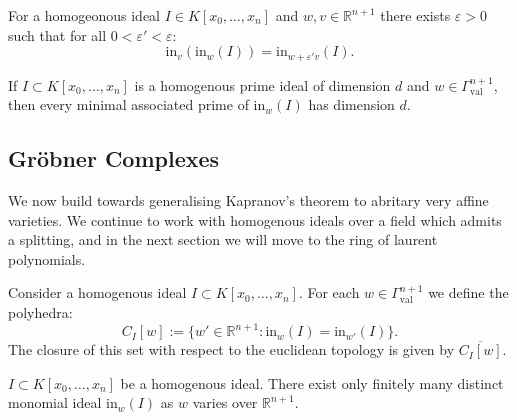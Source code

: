     \begin{proposition}
        \label{ininIdeal}
        For a homogeonous ideal $I \in K[x_0,\dots,x_n]$ and $w,v \in \mathbb{R}^{n+1}$ there exists $\varepsilon >0$ such that for all $0<\varepsilon ' < \varepsilon$:
        \begin{equation*}
            \text{in}_{v}(\text{in}_{w}(I)) = \text{in}_{w + \varepsilon 'v}(I).
        \end{equation*}
    \end{proposition}

    \begin{lemma}
        If $I \subset K[x_0,\dots,x_n]$ is a homogenous prime ideal of dimension $d$ and $w \in \Gamma_{\text{val}}^{n+1}$, then every minimal associated prime of $\text{in}_{w}(I)$ has dimension $d$.
    \end{lemma}

\subsection{Gr\"{o}bner Complexes}

We now build towards generalising Kapranov's theorem to abritary very affine varieties.
We continue to work with homogenous ideals over a field which admits a splitting, and in the next section we will move to the ring of laurent polynomials.

\begin{definition}
    Consider a homogenous ideal $I \subset K[x_{0},\dots, x_{n}]$.
For each $w \in \Gamma_{\text{val}}^{n+1}$ we define the polyhedra:
\begin{equation*}
    C_{I}[w] := \{w' \in \mathbb{R}^{n+1}: \text{in}_{w}(I) = \text{in}_{w'}(I)\}.
\end{equation*}
    The closure of this set with respect to the euclidean topology is given by $\overline{C_{I}[w]}$.
\end{definition}

\begin{proposition}
    \label{finInIdProp}
    $I\subset K[x_{0},\dots,x_{n}]$ be a homogenous ideal.
    There exist only finitely many distinct monomial ideal $\text{in}_{w}(I)$ as $w$ varies over $\mathbb{R}^{n+1}$.
\end{proposition}

